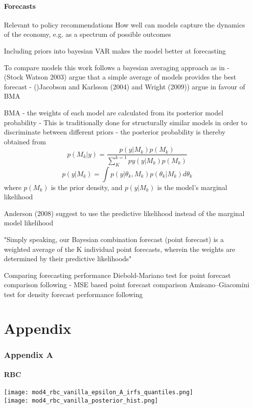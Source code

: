 \documentclass[11pt,a4paper,english]{article} %
\begin{document}
	
	
	
	
	
	
	\subsection{Forecasts}
	Relevant to policy recommendations
	How well can models capture the dynamics of the economy, e.g. as a spectrum of possible outcomes
	
	Including priors into bayesian VAR makes the model better at forecasting \cite{chin_bayesian_2019}
	
	
	To compare models this work follows a bayesian averaging approach as in \cite{chin_bayesian_2019}
	- (Stock Watson 2003) argue that a simple average of models provides the best forecast
	- ()Jacobson and Karlsson (2004) and Wright (2009)) argue in favour of BMA
	
	
	BMA
	- the weights of each model are calculated from its posterior model probability \cite{chin_bayesian_2019}
	- This is traditionally done for structurally similar models in order to discriminate between different priors
	- the posterior probability is thereby obtained from \cite{chin_bayesian_2019}
	\[
		p(M_k | y) = \frac{p(y | M_k) p(M_k)}{\sum_{K}^{k=1} py(y | M_k) p(M_k)}
	\]
	\[
		p(y | M_k) = \int p( y| \theta_k, M_k) p(\theta_k | M_k) d \theta_k
	\]
	where $p(M_k)$ is the prior density, and $p(y | M_k)$ is the model's marginal likelihood
	
	Anderson (2008) suggest to use the predictive likelihood instead of the marginal model likelihood
	
	"Simply speaking, our Bayesian combination forecast (point forecast) is a weighted average of the K individual point forecasts, wherein the weights are determined by their predictive likelihoods" \cite{chin_bayesian_2019}
	
	Comparing forecasting performance
	Diebold-Mariano test for point forecast comparison following \cite{chin_bayesian_2019}
	- MSE based point forecast comparison 
	Amisano–Giacomini test for density forecast performance following  \cite{chin_bayesian_2019}

	
	
	\pagebreak
	
	
	
	\part{Appendix}
	
	\section{Appendix A}
	
	\subsection{RBC}
	
	\texttt{[image: mod4\_rbc\_vanilla\_epsilon\_A\_irfs\_quantiles.png]}\\
	
	\texttt{[image: mod4\_rbc\_vanilla\_posterior\_hist.png]}
\end{document}
